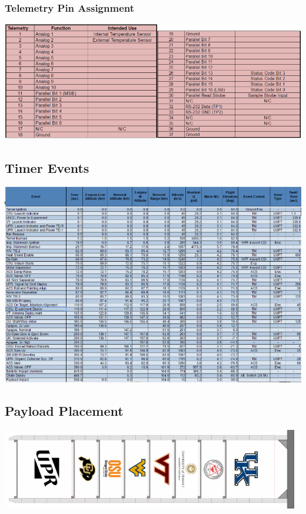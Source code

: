 \subsubsection{Telemetry Pin Assignment}
\includegraphics[width=\textwidth]{./images/OtherDocs/telemetryPinAssignments}

\subsection{Timer Events}
\includegraphics[width=\textwidth]{./images/OtherDocs/timerEvents}

\subsection{Payload Placement}
\includegraphics[width=\textwidth]{./images/OtherDocs/placement}

